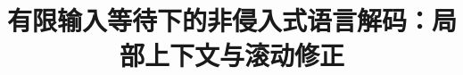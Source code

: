 \documentclass[11pt]{article}
\title{有限输入等待下的非侵入式语言解码：局部上下文与滚动修正}
\author{}
\date{}
\begin{document}
\maketitle
\nocite{moses2021neuroprosthesis,willett2023speech,card2024speech,wairagkar2025voice,defossez2023decoding,dascoli2025word,levy2026brain2qwerty,littlejohn2025streaming,lu2025braininspired,jayalath2025unlocking}








\FloatBarrier



\clearpage
\appendix
\setcounter{figure}{0}
\setcounter{table}{0}
\makeatletter
{}
\makeatother
\renewcommand{\thefigure}{\thesection\arabic{figure}}
\renewcommand{\thetable}{\thesection\arabic{table}}
\renewcommand{\theHfigure}{appendix.\thesection.\arabic{figure}}
\renewcommand{\theHtable}{appendix.\thesection.\arabic{table}}

\FloatBarrier
\end{document}
